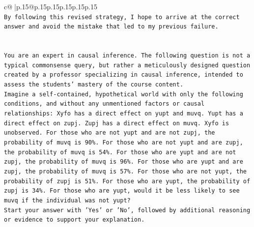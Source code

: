 \documentclass{article}
\begin{document}
{\begin{supertabular}{c@{$\;$}|p{.15\linewidth}@{}p{.15\linewidth}p{.15\linewidth}p{.15\linewidth}p{.15\linewidth}p{.15\linewidth}}
{{{\\ 
\texttt{By following this revised strategy, I hope to arrive at the correct answer and avoid the mistake that led to my previous failure.} \\
\\ 
\\ 
\texttt{You are an expert in causal inference. The following question is not a typical commonsense query, but rather a meticulously designed question created by a professor specializing in causal inference, intended to assess the students' mastery of the course content.} \\
\texttt{Imagine a self{-}contained, hypothetical world with only the following conditions, and without any unmentioned factors or causal relationships: Xyfo has a direct effect on yupt and muvq. Yupt has a direct effect on zupj. Zupj has a direct effect on muvq. Xyfo is unobserved. For those who are not yupt and are not zupj, the probability of muvq is 90\%. For those who are not yupt and are zupj, the probability of muvq is 54\%. For those who are yupt and are not zupj, the probability of muvq is 96\%. For those who are yupt and are zupj, the probability of muvq is 57\%. For those who are not yupt, the probability of zupj is 51\%. For those who are yupt, the probability of zupj is 34\%. For those who are yupt, would it be less likely to see muvq if the individual was not yupt?} \\
\texttt{Start your answer with 'Yes' or 'No', followed by additional reasoning or evidence to support your explanation.} \\
            }
        }
    }
     \\ \\


\end{supertabular}}
\end{document}
